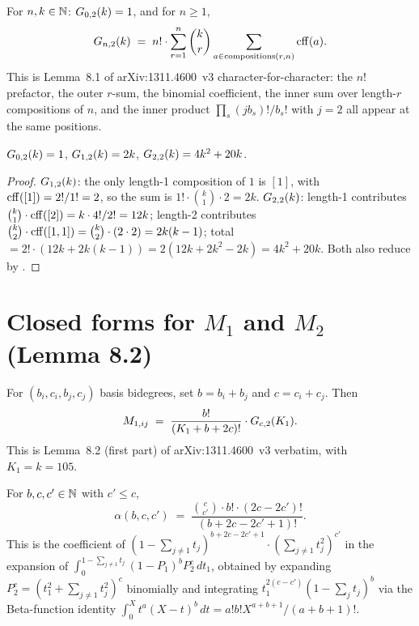 \begin{definition}[Maynard's $G_{n,2}(k)$]\label{def:G_2}
\rocqok
{}
For $n, k \in \mathbb{N}$:
$G_{0, 2}(k) = 1$, and for $n \ge 1$,
\[
G_{n, 2}(k) \;=\; n! \cdot \sum_{r = 1}^{n} \binom{k}{r}
                          \sum_{a \in \mathrm{compositions}(r, n)} \mathrm{cff}(a).
\]
This is Lemma~8.1 of arXiv:1311.4600~v3 character-for-character: the
$n!$ prefactor, the outer $r$-sum, the binomial coefficient, the
inner sum over length-$r$ compositions of $n$, and the inner product
$\prod_s (j b_s)!/b_s!$ with $j = 2$ all appear at the same positions.
\end{definition}

\begin{lemma}\label{lem:G_2_small}
\rocqok
{}
$G_{0, 2}(k) = 1$, $G_{1, 2}(k) = 2k$, $G_{2, 2}(k) = 4 k^2 + 20 k$.
\end{lemma}
\begin{proof}\rocqok
$G_{1, 2}(k)$: the only length-1 composition of $1$ is $[1]$, with
$\mathrm{cff}([1]) = 2!/1! = 2$, so the sum is $1! \cdot \binom{k}{1} \cdot 2 = 2k$.
$G_{2, 2}(k)$: length-1 contributes $\binom{k}{1} \cdot \mathrm{cff}([2]) = k \cdot 4!/2! = 12k$;
length-2 contributes $\binom{k}{2} \cdot \mathrm{cff}([1,1]) = \binom{k}{2} \cdot (2 \cdot 2) = 2k(k-1)$;
total $= 2! \cdot (12k + 2k(k-1)) = 2(12k + 2k^2 - 2k) = 4k^2 + 20k$.
Both also reduce by \vmcompute{}.
\end{proof}

\section{Closed forms for \texorpdfstring{$M_1$ and $M_2$}{M\_1 and M\_2} (Lemma 8.2)}

\begin{definition}[$M_1$ entry]\label{def:M1_entry}
\rocqok
{}
For $(b_i, c_i, b_j, c_j)$ basis bidegrees, set $b = b_i + b_j$ and
$c = c_i + c_j$. Then
\[
M_{1, ij} \;=\; \frac{b!}{(K_1 + b + 2c)!} \cdot G_{c, 2}(K_1).
\]
This is Lemma~8.2 (first part) of arXiv:1311.4600~v3 verbatim, with
$K_1 = k = 105$.
\end{definition}

\begin{definition}\label{def:alpha}
\rocqok
For $b, c, c' \in \mathbb{N}$ with $c' \le c$,
\[
\alpha(b, c, c') \;=\;
   \frac{\binom{c}{c'} \cdot b! \cdot (2c - 2c')!}{(b + 2c - 2c' + 1)!}.
\]
This is the coefficient of
$(1 - \sum_{j \ne 1} t_j)^{b + 2c - 2c' + 1} \cdot (\sum_{j \ne 1} t_j^2)^{c'}$
in the expansion of
$\int_0^{1 - \sum_{j \ne 1} t_j} (1 - P_1)^b P_2^c \, dt_1$,
obtained by expanding $P_2^c = (t_1^2 + \sum_{j \ne 1} t_j^2)^c$
binomially and integrating $t_1^{2(c - c')} (1 - \sum_j t_j)^b$
via the Beta-function identity
$\int_0^X t^a (X - t)^b \, dt = a! b! X^{a + b + 1} / (a + b + 1)!$.
\end{definition}

